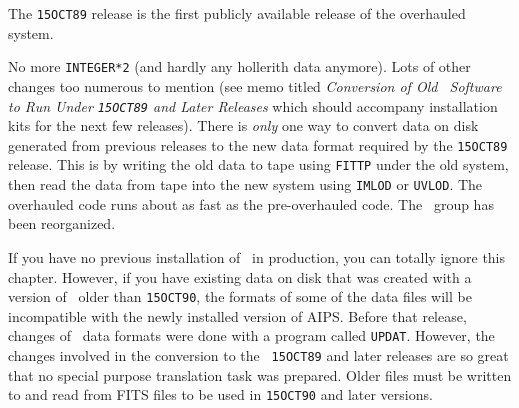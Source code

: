 
\medskip{}

The {\tt 15OCT89} release is the first publicly available release of
the overhauled system.

No more {\tt INTEGER*2} (and hardly any hollerith data anymore).  Lots
of other changes too numerous to mention (see memo titled {\it
Conversion of Old \AIPS\ Software to Run Under {\tt 15OCT89} and Later
Releases\/} which should accompany installation kits for the next few
releases).  There is {\it only\/} one way to convert data on disk
generated from previous releases to the new data format required by
the {\tt 15OCT89} release.  This is by writing the old data to tape
using {\tt FITTP} under the old system, then read the data from tape
into the new system using {\tt IMLOD} or {\tt UVLOD}.  The overhauled
code runs about as fast as the pre-overhauled code. The \AIPS\ group
has been reorganized. \medskip


\medskip


If you have no previous installation of \AIPS\ in production, you can
totally ignore this chapter.  However, if you have existing data on disk
that was created with a version of \AIPS\ older than {\tt 15OCT90}, the
formats of some of the data files will
be incompatible with the newly installed version of AIPS.  Before that
release, changes of \AIPS\ data formats were done with a program called
{\tt UPDAT}.  However, the changes involved in the conversion to the {\tt
15OCT89} and later releases are so great that no special purpose
translation task was prepared.  Older files must be written to and read
from FITS files to be used in {\tt 15OCT90} and later versions.

%
%
%
%

